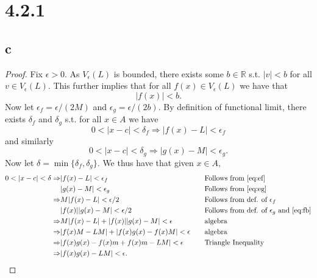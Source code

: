 \documentclass[10pt]{article}
\begin{document}
\section*{4.2.1}

\subsection*{c}

\begin{proof}
    Fix $\epsilon > 0.$ As $V_\epsilon(L)$ is bounded, there exists some $b\in\mathbb{R}$ s.t. $|v|<b$ for all $v\in V_\epsilon(L).$ This further implies that for all $f(x)\in V_\epsilon(L)$ we have that
    \begin{equation} \label{eq:fb}
        |f(x)|<b.
    \end{equation}    
    Now let $\epsilon_f = \epsilon/(2M)$ and $\epsilon_g = \epsilon/(2b).$ By definition of functional limit,
    there exists $\delta_f$ and $\delta_g$ s.t. for all $x\in A$ we have
    \begin{equation} \label{eq:ef}
        0<|x-c|<\delta_f \Rightarrow |f(x)-L|<\epsilon_f
    \end{equation}
    and similarly
    \begin{equation} \label{eq:eg}
        0<|x-c|<\delta_g \Rightarrow |g(x)-M|<\epsilon_g.
    \end{equation}
    Now let $\delta = \min\{\delta_f,\delta_g\}.$
    We thus have that given $x\in A,$
    \begin{alignat*}{2}
        0<|x-c|<\delta \Rightarrow& |f(x)-L|<\epsilon_f && \text{Follows from \eqref{eq:ef}}\\ 
        &|g(x)-M|<\epsilon_g && \text{Follows from \eqref{eq:eg}}\\
        \Rightarrow& M|f(x)-L| < \epsilon/2 && \text{Follows from def. of $\epsilon_f$}\\
        &|f(x)||g(x)-M| < \epsilon/2 &&\text{Follows from def. of $\epsilon_g$ and \eqref{eq:fb}}\\
        \Rightarrow&  M|f(x)-L| + |f(x)||g(x)-M| < \epsilon &&\text{algebra}\\
        \Rightarrow& |f(x)M - LM| + |f(x)g(x)-f(x)M|<\epsilon \quad&&\text{algebra}\\
        \Rightarrow& |f(x)g(x) - f(x)m+f(x)m-LM|<\epsilon &&\text{Triangle Inequality}\\
        \Rightarrow& |f(x)g(x)-LM|<\epsilon.
    \end{alignat*}
\end{proof}
\end{document}
